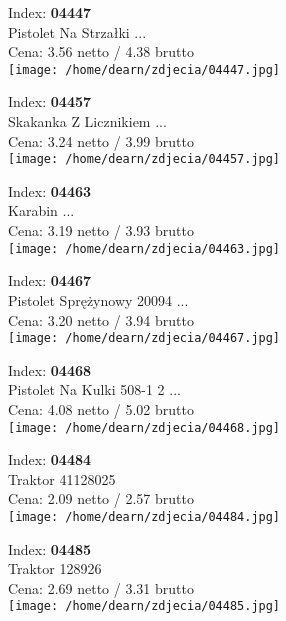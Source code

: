 {Index: \textbf{04447}\\
Pistolet Na Strzałki      ...\\
Cena: 3.56 netto / 4.38 brutto\\
  \texttt{[image: /home/dearn/zdjecia/04447.jpg]}}\newline\newline

{Index: \textbf{04457}\\
Skakanka Z Licznikiem     ...\\
Cena: 3.24 netto / 3.99 brutto\\
  \texttt{[image: /home/dearn/zdjecia/04457.jpg]}}\newline\newline

{Index: \textbf{04463}\\
Karabin                   ...\\
Cena: 3.19 netto / 3.93 brutto\\
  \texttt{[image: /home/dearn/zdjecia/04463.jpg]}}\newline\newline

{Index: \textbf{04467}\\
Pistolet Sprężynowy 20094 ...\\
Cena: 3.20 netto / 3.94 brutto\\
  \texttt{[image: /home/dearn/zdjecia/04467.jpg]}}\newline\newline

{Index: \textbf{04468}\\
Pistolet Na Kulki 508-1 2 ...\\
Cena: 4.08 netto / 5.02 brutto\\
  \texttt{[image: /home/dearn/zdjecia/04468.jpg]}}\newline\newline

{Index: \textbf{04484}\\
Traktor  41128025\\
Cena: 2.09 netto / 2.57 brutto\\
  \texttt{[image: /home/dearn/zdjecia/04484.jpg]}}\newline\newline

{Index: \textbf{04485}\\
Traktor 128926\\
Cena: 2.69 netto / 3.31 brutto\\
  \texttt{[image: /home/dearn/zdjecia/04485.jpg]}}\newline\newline

